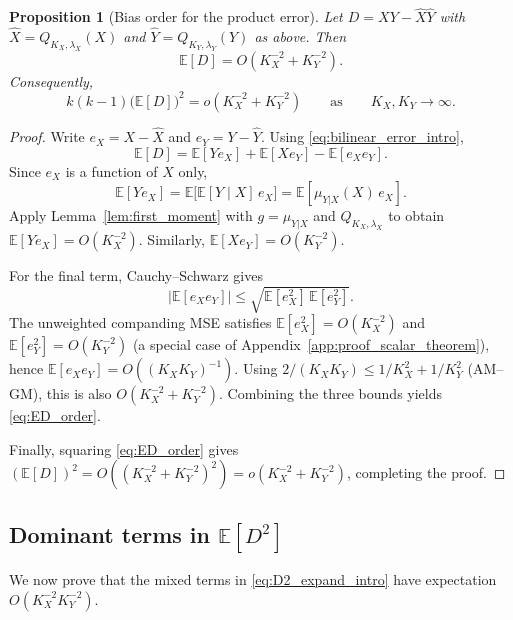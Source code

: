 \documentclass{article}
\newtheorem{proposition}{Proposition}
\newcommand{\E}{\mathbb{E}}
\newcommand{\abs}[1]{\left\lvert #1 \right\rvert}
\begin{document}
\begin{proposition}[Bias order for the product error]\label{prop:bias_order}
Let $D=XY-\widehat X\widehat Y$ with $\widehat X=Q_{K_X,\lambda_X}(X)$ and $\widehat Y=Q_{K_Y,\lambda_Y}(Y)$ as above. Then
\begin{equation}\label{eq:ED_order}
\E[D]=O(K_X^{-2}+K_Y^{-2}).
\end{equation}
Consequently,
\[
k(k-1)\big(\E[D]\big)^2 = o(K_X^{-2}+K_Y^{-2})
\qquad\text{as}\qquad K_X,K_Y\to\infty.
\]
\end{proposition}
\begin{proof}
Write $e_X=X-\widehat X$ and $e_Y=Y-\widehat Y$. Using \eqref{eq:bilinear_error_intro},
\[
\E[D]=\E[Ye_X]+\E[Xe_Y]-\E[e_Xe_Y].
\]
Since $e_X$ is a function of $X$ only,
\[
\E[Ye_X]=\E\big[\E[Y\mid X]\,e_X\big]=\E[\mu_{Y|X}(X)\,e_X].
\]
Apply Lemma~\ref{lem:first_moment} with $g=\mu_{Y|X}$ and $Q_{K_X,\lambda_X}$ to obtain $\E[Ye_X]=O(K_X^{-2})$.
Similarly, $\E[Xe_Y]=O(K_Y^{-2})$.

For the final term, Cauchy--Schwarz gives
\[
\abs{\E[e_Xe_Y]}\le \sqrt{\E[e_X^2]\,\E[e_Y^2]}.
\]
The unweighted companding MSE satisfies $\E[e_X^2]=O(K_X^{-2})$ and $\E[e_Y^2]=O(K_Y^{-2})$ (a special case of Appendix~\ref{app:proof_scalar_theorem}), hence $\E[e_Xe_Y]=O((K_XK_Y)^{-1})$. Using $2/(K_XK_Y)\le 1/K_X^2+1/K_Y^2$ (AM--GM), this is also $O(K_X^{-2}+K_Y^{-2})$.
Combining the three bounds yields \eqref{eq:ED_order}.

Finally, squaring \eqref{eq:ED_order} gives $(\E[D])^2=O((K_X^{-2}+K_Y^{-2})^2)=o(K_X^{-2}+K_Y^{-2})$, completing the proof.
\end{proof}

\subsection{Dominant terms in $\E[D^2]$}\label{app:D2_dominant}
We now prove that the mixed terms in \eqref{eq:D2_expand_intro} have expectation $O(K_X^{-2}K_Y^{-2})$.
\end{document}
